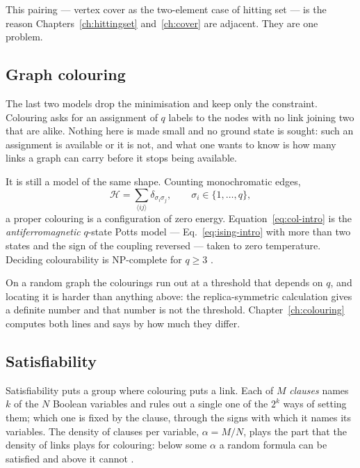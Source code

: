 This pairing --- vertex cover as the two-element case of hitting set --- is the
reason Chapters~\ref{ch:hittingset} and~\ref{ch:cover} are adjacent. They are one
problem.

\subsection{Graph colouring}
\label{sec:colouring-intro}

The last two models drop the minimisation and keep only the constraint.
Colouring asks for an assignment of $q$ labels to the nodes with no link joining
two that are alike. Nothing here is made small and no ground state is sought:
such an assignment is available or it is not, and what one wants to know is how
many links a graph can carry before it stops being available.

It is still a model of the same shape. Counting monochromatic edges,
\begin{equation}
  \mathcal{H}=\sum_{\langle ij\rangle}\delta_{\sigma_{i}\sigma_{j}},
  \qquad \sigma_{i}\in\{1,\dots,q\},
  \label{eq:col-intro}
\end{equation}
a proper colouring is a configuration of zero energy. Equation~\eqref{eq:col-intro}
is the \emph{antiferromagnetic} $q$-state Potts model --- Eq.~\eqref{eq:ising-intro}
with more than two states and the sign of the coupling reversed --- taken to zero
temperature. Deciding colourability is NP-complete for $q\ge3$ \citep{karp1972}.

On a random graph the colourings run out at a threshold that depends on $q$, and
locating it is harder than anything above: the replica-symmetric calculation
gives a definite number and that number is not the threshold.
Chapter~\ref{ch:colouring} computes both lines and says by how much they differ.

\subsection{Satisfiability}
\label{sec:sat-intro}

Satisfiability puts a group where colouring puts a link. Each of $M$
\emph{clauses} names $k$ of the $N$ Boolean variables and rules out a single one
of the $2^{k}$ ways of setting them; which one is fixed by the clause, through
the signs with which it names its variables. The density of clauses per
variable, $\alpha=M/N$, plays the part that the density of links plays for
colouring: below some $\alpha$ a random formula can be satisfied and above it
cannot \citep{mezard2002science,montanari2008}.

